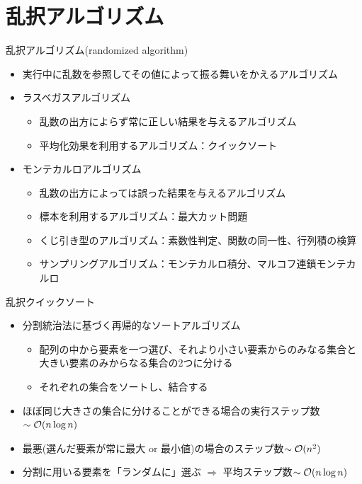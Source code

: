 \section{乱択アルゴリズム}

\begin{frame}[t,fragile]{乱択アルゴリズム(randomized algorithm)}
  \begin{itemize}
    \setlength{\itemsep}{1em}
  \item 実行中に乱数を参照してその値によって振る舞いをかえるアルゴリズム
  \item ラスベガスアルゴリズム
    \begin{itemize}
    \item 乱数の出方によらず常に正しい結果を与えるアルゴリズム
    \item 平均化効果を利用するアルゴリズム：クイックソート
    \end{itemize}
  \item モンテカルロアルゴリズム
    \begin{itemize}
    \item 乱数の出方によっては誤った結果を与えるアルゴリズム
    \item 標本を利用するアルゴリズム：最大カット問題
    \item くじ引き型のアルゴリズム：素数性判定、関数の同一性、行列積の検算
    \item サンプリングアルゴリズム：モンテカルロ積分、マルコフ連鎖モンテカルロ
    \end{itemize}
  \end{itemize}
\end{frame}

\begin{frame}[t,fragile]{乱択クイックソート}
  \begin{itemize}
    \setlength{\itemsep}{1em}
  \item 分割統治法に基づく再帰的なソートアルゴリズム
    \begin{itemize}
      \item 配列の中から要素を一つ選び、それより小さい要素からのみなる集合と大きい要素のみからなる集合の2つに分ける
      \item それぞれの集合をソートし、結合する
    \end{itemize}
    \item ほぼ同じ大きさの集合に分けることができる場合の実行ステップ数$\sim {\cal O}(n \log n)$
    \item 最悪(選んだ要素が常に最大 or 最小値)の場合のステップ数$\sim {\cal O}(n^2)$
    \item 分割に用いる要素を「ランダムに」選ぶ $\Rightarrow$ 平均ステップ数$\sim {\cal O}(n \log n)$
  \end{itemize}
\end{frame}

